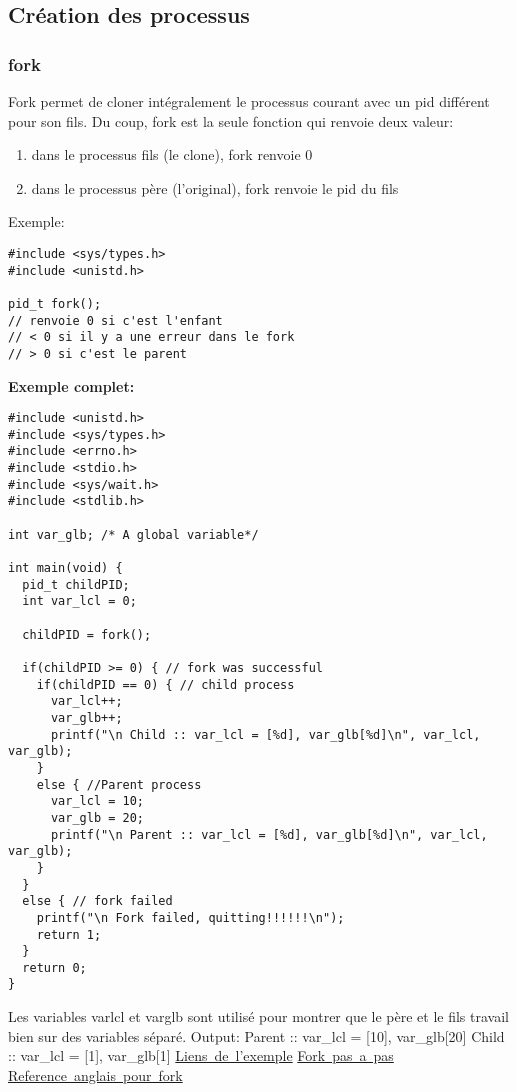 \documentclass[a4paper]{article}
\begin{document}
\subsection{Création des processus}
\subsubsection{fork}
Fork permet de cloner intégralement le processus courant avec un pid différent pour son fils.
Du coup, fork est la seule fonction qui renvoie deux valeur:
\begin{enumerate}
  \item dans le processus fils (le clone), fork renvoie 0
  \item dans le processus père (l'original), fork renvoie le pid du fils
\end{enumerate}
Exemple:
\begin{lstlisting}
#include <sys/types.h>
#include <unistd.h>

pid_t fork();
// renvoie 0 si c'est l'enfant
// < 0 si il y a une erreur dans le fork
// > 0 si c'est le parent
\end{lstlisting}
\newpage
\textbf{Exemple complet:}
\begin{lstlisting}
#include <unistd.h>
#include <sys/types.h>
#include <errno.h>
#include <stdio.h>
#include <sys/wait.h>
#include <stdlib.h>

int var_glb; /* A global variable*/

int main(void) {
  pid_t childPID;
  int var_lcl = 0;

  childPID = fork();

  if(childPID >= 0) { // fork was successful
    if(childPID == 0) { // child process
      var_lcl++;
      var_glb++;
      printf("\n Child :: var_lcl = [%d], var_glb[%d]\n", var_lcl, var_glb);
    }
    else { //Parent process
      var_lcl = 10;
      var_glb = 20;
      printf("\n Parent :: var_lcl = [%d], var_glb[%d]\n", var_lcl, var_glb);
    }
  }
  else { // fork failed
    printf("\n Fork failed, quitting!!!!!!\n");
    return 1;
  }
  return 0;
}
\end{lstlisting}
Les variables var\textunderscore{}lcl et var\textunderscore{}glb sont utilisé pour montrer que le père et le fils travail bien sur des variables séparé.\newline
Output:\newline
Parent :: var_lcl = [10], var_glb[20]\newline
Child :: var_lcl = [1], var_glb[1]\newline
\href{https://www.thegeekstuff.com/2012/05/c-fork-function/}{Liens~de~l'exemple}\newline
\href{http://www.commentcamarche.net/faq/10611-que-fait-un-fork}{Fork~pas~a~pas}\newline
\href{http://pubs.opengroup.org/onlinepubs/9699919799/functions/fork.html#}{Reference~anglais~pour~fork}\newline
\end{document}
